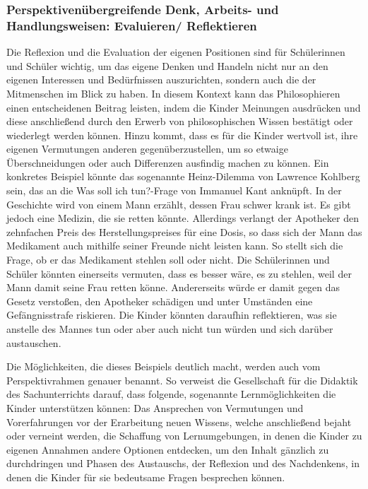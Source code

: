 \subsubsection{Perspektivenübergreifende Denk, Arbeits- und Handlungsweisen: Evaluieren/ Reflektieren}


Die Reflexion und die Evaluation der eigenen Positionen sind für Schülerinnen und Schüler wichtig, um das eigene Denken und Handeln nicht nur an den eigenen Interessen und Bedürfnissen auszurichten, sondern auch die der Mitmenschen im Blick zu haben. 
In diesem Kontext kann das Philosophieren einen entscheidenen Beitrag leisten, indem die Kinder Meinungen ausdrücken und diese anschließend durch den Erwerb von philosophischen Wissen bestätigt oder wiederlegt werden können. 
Hinzu kommt, dass es für die Kinder wertvoll ist, ihre eigenen Vermutungen anderen gegenüberzustellen, um so etwaige Überschneidungen oder auch Differenzen ausfindig machen zu können. 
Ein konkretes Beispiel könnte das sogenannte \glqq Heinz-Dilemma\grqq{} von Lawrence Kohlberg sein, das an die \glqq Was soll ich tun?\grqq{}-Frage von Immanuel Kant anknüpft. 
In der Geschichte wird von einem Mann erzählt, dessen Frau schwer krank ist. 
Es gibt jedoch eine Medizin, die sie retten könnte.
 Allerdings verlangt der Apotheker den zehnfachen Preis des Herstellungspreises für eine Dosis, so dass sich der Mann das Medikament auch mithilfe seiner Freunde nicht leisten kann. 
 So stellt sich die Frage, ob er das Medikament stehlen soll oder nicht. 
 Die Schülerinnen und Schüler könnten einerseits vermuten, dass es besser wäre, es zu stehlen, weil der Mann damit seine Frau retten könne.
 Andererseits würde er damit gegen das Gesetz verstoßen, den Apotheker schädigen und unter Umständen eine Gefängnisstrafe riskieren. 
 Die Kinder könnten daraufhin reflektieren, was sie anstelle des Mannes tun oder aber auch nicht tun würden und sich darüber austauschen.

Die Möglichkeiten, die dieses Beispiels deutlich macht, werden auch vom Perspektivrahmen genauer benannt.
So verweist die Gesellschaft für die Didaktik des Sachunterrichts darauf, dass folgende, sogenannte \glqq Lernmöglichkeiten\grqq{} die Kinder unterstützen können:
Das Ansprechen von \glqq Vermutungen und Vorerfahrungen vor der Erarbeitung neuen Wissens\grqq{}\cite[S.\,23]{GDS13}, welche anschließend bejaht oder verneint werden, die Schaffung von Lernumgebungen, in denen die Kinder zu eigenen Annahmen andere Optionen entdecken, um den Inhalt gänzlich zu durchdringen und Phasen des Austauschs, der Reflexion und des Nachdenkens, in denen die Kinder für sie bedeutsame Fragen besprechen können.

